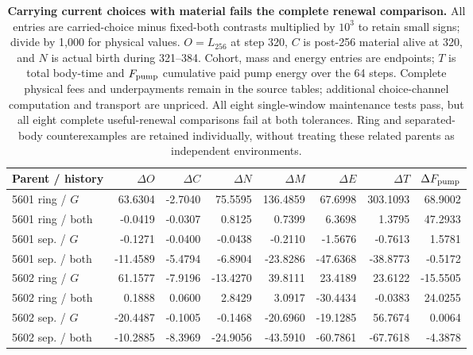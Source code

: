 \begin{table}[htbp]
\centering\footnotesize
\setlength{\tabcolsep}{3pt}
\begin{tabular}{lrrrrrrr}
\toprule
Parent / history & $\Delta O$ & $\Delta C$ & $\Delta N$ & $\Delta M$ & $\Delta E$ & $\Delta T$ & $\Delta F_{\rm pump}$ \\
\midrule
5601 ring / $G$ & 63.6304 & -2.7040 & 75.5595 & 136.4859 & 67.6998 & 303.1093 & 68.9002 \\
5601 ring / both & -0.0419 & -0.0307 & 0.8125 & 0.7399 & 6.3698 & 1.3795 & 47.2933 \\
5601 sep. / $G$ & -0.1271 & -0.0400 & -0.0438 & -0.2110 & -1.5676 & -0.7613 & 1.5781 \\
5601 sep. / both & -11.4589 & -5.4794 & -6.8904 & -23.8286 & -47.6368 & -38.8773 & -0.5172 \\
5602 ring / $G$ & 61.1577 & -7.9196 & -13.4270 & 39.8111 & 23.4189 & 23.6122 & -15.5505 \\
5602 ring / both & 0.1888 & 0.0600 & 2.8429 & 3.0917 & -30.4434 & -0.0383 & 24.0255 \\
5602 sep. / $G$ & -20.4487 & -0.1005 & -0.1468 & -20.6960 & -19.1285 & 56.7674 & 0.0064 \\
5602 sep. / both & -10.2885 & -8.3969 & -24.9056 & -43.5910 & -60.7861 & -67.7618 & -4.3878 \\
\bottomrule
\end{tabular}
\caption{\textbf{Carrying current choices with material fails the complete renewal comparison.} All entries are carried-choice minus fixed-both contrasts multiplied by $10^3$ to retain small signs; divide by 1,000 for physical values. $O=L_{256}$ at step 320, $C$ is post-256 material alive at 320, and $N$ is actual birth during 321--384. Cohort, mass and energy entries are endpoints; $T$ is total body-time and $F_{\rm pump}$ cumulative paid pump energy over the 64 steps. Complete physical fees and underpayments remain in the source tables; additional choice-channel computation and transport are unpriced. All eight single-window maintenance tests pass, but all eight complete useful-renewal comparisons fail at both tolerances. Ring and separated-body counterexamples are retained individually, without treating these related parents as independent environments.}
\label{tab:material-carried-choice}
\end{table}
